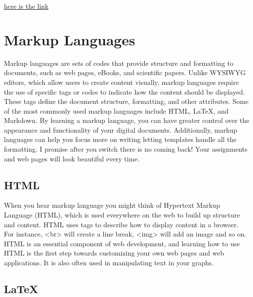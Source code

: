 \documentclass[
  letterpaper,
]{book}
\begin{document}
\href{https://www.linkedin.com/learning-login/share?account=2204681\&forceAccount=false\&redirect=https\%3A\%2F\%2Fwww.linkedin.com\%2Flearning\%2Fcert-prep-word-associate-microsoft-office-specialist-for-office-2019\%3Ftrk\%3Dshare_ent_url\%26shareId\%3DSTM\%252FLOpvQwOb0jWc9D\%252FabQ\%253D\%253D}{here
is the link}

\hypertarget{markup-languages}{%
\section{Markup Languages}\label{markup-languages}}

Markup languages are sets of codes that provide structure and formatting
to documents, such as web pages, eBooks, and scientific papers. Unlike
WYSIWYG editors, which allow users to create content visually, markup
languages require the use of specific tags or codes to indicate how the
content should be displayed. These tags define the document structure,
formatting, and other attributes. Some of the most commonly used markup
languages include HTML, LaTeX, and Markdown. By learning a markup
language, you can have greater control over the appearance and
functionality of your digital documents. Additionally, markup languages
can help you focus more on writing letting templates handle all the
formatting. I promise after you switch there is no coming back! Your
assignments and web pages will look beautiful every time.

\hypertarget{html}{%
\subsection{HTML}\label{html}}

When you hear markup language you might think of Hypertext Markup
Language (HTML), which is used everywhere on the web to build up
structure and content. HTML uses tags to describe how to display content
in a browser. For instance, \textless br\textgreater{} will create a
line break, \textless img\textgreater{} will add an image and so on.
HTML is an essential component of web development, and learning how to
use HTML is the first step towards customizing your own web pages and
web applications. It is also often used in manipulating text in your
graphs.

\hypertarget{latex}{%
\subsection{LaTeX}\label{latex}}
\end{document}
